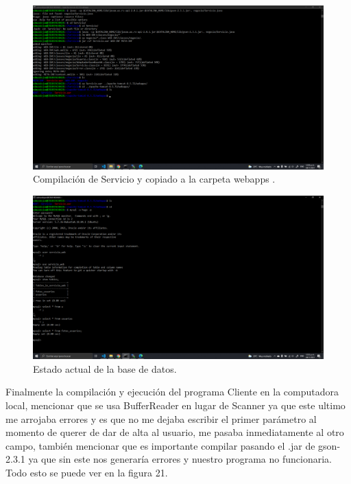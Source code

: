 \documentclass[11pt]{article}
\begin{document}
		\begin{figure}[H]
			\centering
			\includegraphics[scale=0.34]{resources/compilacionservicioon.png}
			\caption{Compilación de Servicio y copiado a la carpeta webapps .}\label{fig:picture}
		\end{figure}
		\begin{figure}[H]
			\centering
			\includegraphics[scale=0.34]{resources/dbempty.png}
			\caption{Estado actual de la base de datos.}\label{fig:picture}
		\end{figure}
		Finalmente la compilación y ejecución del programa Cliente en la computadora local, mencionar que se usa BufferReader en lugar de Scanner ya que este ultimo me arrojaba errores y es que no me dejaba escribir el primer parámetro al momento de querer de dar de alta al usuario, me pasaba inmediatamente al otro campo, también mencionar que es importante compilar pasando el .jar de gson-2.3.1 ya que sin este nos generaría errores y nuestro programa no funcionaria. Todo esto se puede ver en la figura 21.
\end{document}
